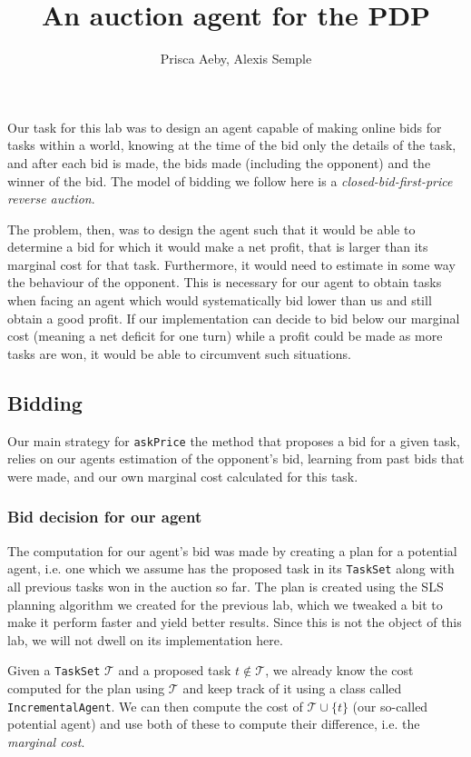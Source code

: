 \documentclass[12pt,a4paper]{article}
\author{Prisca Aeby, Alexis Semple}
\title{An auction agent for the PDP}
\date{}
\begin{document}
\maketitle

Our task for this lab was to design an agent capable of making online bids for tasks within a world, knowing at the time of the bid only the details of the task, and after each bid is made, the bids made (including the opponent) and the winner of the bid. The model of bidding we follow here is a \emph{closed-bid-first-price reverse auction}.

The problem, then, was to design the agent such that it would be able to determine a bid for which it would make a net profit, that is larger than its marginal cost for that task. Furthermore, it would need to estimate in some way the behaviour of the opponent. This is necessary for our agent to obtain tasks when facing an agent which would systematically bid lower than us and still obtain a good profit. If our implementation can decide to bid below our marginal cost (meaning a net deficit for one turn) while a profit could be made as more tasks are won, it would be able to circumvent such situations.

\subsection*{Bidding}
Our main strategy for \texttt{askPrice} the method that proposes a bid for a given task, relies on our agents estimation of the opponent's bid, learning from past bids that were made, and our own marginal cost calculated for this task.

\subsubsection*{Bid decision for our agent}
The computation for our agent's bid was made by creating a plan for a potential agent, i.e. one which we assume has the proposed task in its \texttt{TaskSet} along with all previous tasks won in the auction so far. The plan is created using the SLS planning algorithm we created for the previous lab, which we tweaked a bit to make it perform faster and yield better results. Since this is not the object of this lab, we will not dwell on its implementation here. 

Given a \texttt{TaskSet} $\mathcal{T}$ and a proposed task $t  \notin \mathcal{T}$, we already know the cost computed for the plan using $\mathcal{T}$ and keep track of it using a class called \texttt{IncrementalAgent}. We can then compute the cost of $\mathcal{T} \cup \lbrace t\rbrace$ (our so-called potential agent) and use both of these to compute their difference, i.e. the \emph{marginal cost}.
\end{document}

